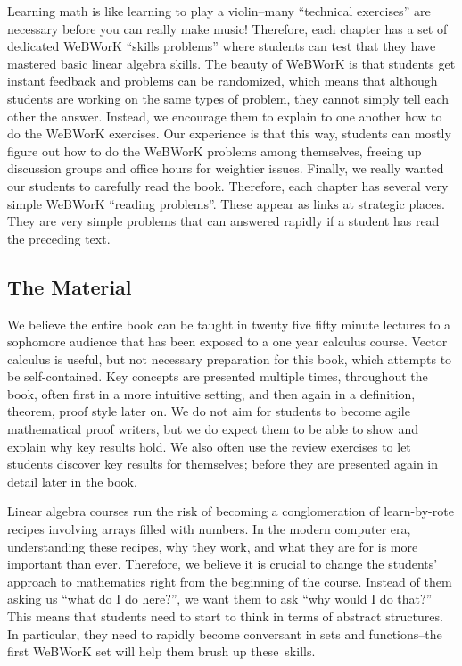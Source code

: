 Learning math is like learning to play a violin--many ``technical exercises'' are
necessary before you can really make music! Therefore, each chapter has a set of dedicated WeBWorK ``skills problems'' where students can test that they have mastered basic linear algebra skills. The beauty of WeBWorK is that students get instant feedback and
problems can be randomized, which means that although students are working on the same types of problem, they cannot simply 
tell each other the answer. Instead, we encourage them to explain to one another how to do the WeBWorK exercises. 
Our experience is that this way, students can mostly figure out how to do the WeBWorK problems among themselves, freeing up discussion groups and office hours for weightier issues.  Finally, we really wanted our students to carefully read the book. Therefore, each chapter has several very simple WeBWorK ``reading problems''. These appear as links at strategic places. They are very simple problems that can 
answered rapidly if a student has read the preceding text.

\subsection*{The Material}

We believe the entire book can be taught in twenty five fifty minute lectures to a sophomore audience that has been exposed to a one year 
calculus course. Vector calculus is useful, but not necessary preparation for this book, which attempts to be self-contained.
Key concepts are presented multiple times, throughout the book, often first in a more intuitive setting, and then again 
in a definition, theorem, proof style later on. We do not aim for students to become agile mathematical proof writers, but we 
do expect them to be able to show and explain why key results hold. We also often use the review exercises to let students discover
key results for themselves; before they are presented again in detail later in the book. 

Linear algebra courses run the risk of becoming a conglomeration of learn-by-rote recipes involving arrays filled with numbers.
In the modern computer era, understanding these recipes, why they work, and what they are for is more important than ever.
Therefore, we believe it is crucial to change the students' approach to mathematics right from the beginning of the course. Instead of
them asking us ``what do I do here?'', we want them to ask ``why would I do that?'' This means that students need to start to think in terms of
abstract structures. In particular, they need to rapidly become conversant in sets and functions--the first WeBWorK set will help 
them brush up these~skills.

